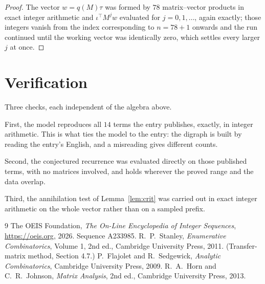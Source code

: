 \documentclass[11pt,a4paper]{article}
\theoremstyle{plain}
\theoremstyle{definition}
\begin{document}
\begin{proof}
The vector $w=q(M)\tau$ was formed by $78$ matrix--vector products in exact integer
arithmetic and $\iota^{\!\top}M^{j}w$ evaluated for $j=0,1,\dots$, again exactly; those
integers vanish from the index corresponding to $n=78+1$ onwards and the run continued
until the working vector was identically zero, which settles every larger $j$ at once.
\end{proof}

\section{Verification}

Three checks, each independent of the algebra above.

First, the model reproduces all $14$ terms the entry publishes, exactly, in integer
arithmetic. This is what ties the model to the entry: the digraph is built by reading the
entry's English, and a misreading gives different counts.

Second, the conjectured recurrence was evaluated directly on those published terms, with no
matrices involved, and holds wherever the proved range and the data overlap.

Third, the annihilation test of Lemma~\ref{lem:crit} was carried out in exact integer
arithmetic on the whole vector rather than on a sampled prefix.

\begin{thebibliography}{9}
 The OEIS Foundation, \emph{The On-Line Encyclopedia of Integer
Sequences}, \url{https://oeis.org}, 2026. Sequence A233985.
 R.~P.~Stanley, \emph{Enumerative Combinatorics}, Volume 1, 2nd ed.,
Cambridge University Press, 2011. (Transfer-matrix method, Section 4.7.)
 P.~Flajolet and R.~Sedgewick, \emph{Analytic Combinatorics}, Cambridge
University Press, 2009.
 R.~A.~Horn and C.~R.~Johnson, \emph{Matrix Analysis}, 2nd ed., Cambridge
University Press, 2013.
\end{thebibliography}
\end{document}

